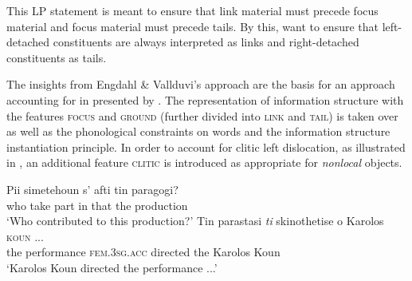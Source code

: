 \documentclass[output=paper]{langsci/langscibook}
\begin{document}
  \label{fig:lp-catalan}
\z
This LP statement is meant to ensure that link material must precede
focus material and focus material must precede tails. By this,
\cite{EV96a} want to ensure that left-detached constituents are always
interpreted as links and right-detached constituents as tails.

The insights from Engdahl \& Vallduvi's approach are the basis for an
approach accounting for  in  presented by
\cite{AK2002a}. The representation of information structure with the
features \textsc{focus} and \textsc{ground} (further divided into
\textsc{link} and \textsc{tail}) is taken over as well as the
phonological constraints on words and the information structure
instantiation principle. In order to account for clitic left
dislocation, as illustrated in , an
additional feature \textsc{clitic} is introduced as appropriate for
\textit{nonlocal} objects.

\begin{exe}
  \ex\label{ex:clld-greek}
  \begin{xlist}
    \ex \gll Pii simetehoun s' afti tin paragogi?\\
             who {take part} in that the production\\
    \trans `Who contributed to this production?'
    \ex \gll Tin parastasi \textit{ti} skinothetise o Karolos \textsc{koun} ...\\
    the performance  \textsc{fem.3sg.acc} directed the Karolos Koun\\
   \trans `Karolos Koun directed the performance ...'
  \end{xlist}

\end{exe}
\end{document}
